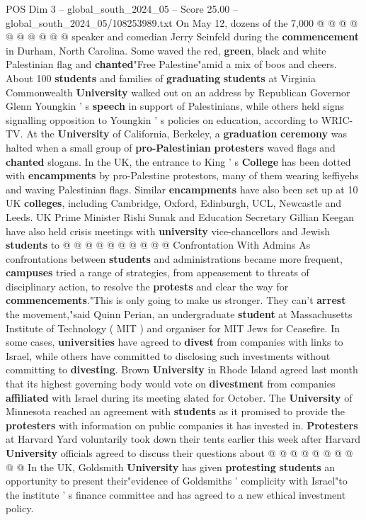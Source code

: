 \begin{textsample}{POS Dim 3 – global\_south\_2024\_05 – Score 25.00 – global\_south\_2024\_05/108253989.txt}
On May 12, dozens of the 7,000 @ @ @ @ @ @ @ @ @ @ speaker and comedian Jerry Seinfeld during the \textbf{commencement} in Durham, North Carolina.
Some waved the red, \textbf{green}, black and white Palestinian flag and \textbf{chanted}"Free Palestine"amid a mix of boos and cheers.
About 100 \textbf{students} and families of \textbf{graduating} \textbf{students} at Virginia Commonwealth \textbf{University} walked out on an address by Republican Governor Glenn Youngkin ' s \textbf{speech} in support of Palestinians, while others held signs signalling opposition to Youngkin ' s policies on education, according to WRIC-TV.
At the \textbf{University} of California, Berkeley, a \textbf{graduation} \textbf{ceremony} was halted when a small group of \textbf{pro-Palestinian} \textbf{protesters} waved flags and \textbf{chanted} slogans.
In the UK, the entrance to King ' s \textbf{College} has been dotted with \textbf{encampments} by pro-Palestine protestors, many of them wearing keffiyehs and waving Palestinian flags.
Similar \textbf{encampments} have also been set up at 10 UK \textbf{colleges}, including Cambridge, Oxford, Edinburgh, UCL, Newcastle and Leeds.
UK Prime Minister Rishi Sunak and Education Secretary Gillian Keegan have also held crisis meetings with \textbf{university} vice-chancellors and Jewish \textbf{students} to @ @ @ @ @ @ @ @ @ @ Confrontation With Admins As confrontations between \textbf{students} and administrations became more frequent, \textbf{campuses} tried a range of strategies, from appeasement to threats of disciplinary action, to resolve the \textbf{protests} and clear the way for \textbf{commencements}."This is only going to make us stronger.
They can't \textbf{arrest} the movement,"said Quinn Perian, an undergraduate \textbf{student} at Massachusetts Institute of Technology ( MIT ) and organiser for MIT Jews for Ceasefire.
In some cases, \textbf{universities} have agreed to \textbf{divest} from companies with links to Israel, while others have committed to disclosing such investments without committing to \textbf{divesting}.
Brown \textbf{University} in Rhode Island agreed last month that its highest governing body would vote on \textbf{divestment} from companies \textbf{affiliated} with Israel during its meeting slated for October.
The \textbf{University} of Minnesota reached an agreement with \textbf{students} as it promised to provide the \textbf{protesters} with information on public companies it has invested in. \textbf{Protesters} at Harvard Yard voluntarily took down their tents earlier this week after Harvard \textbf{University} officials agreed to discuss their questions about @ @ @ @ @ @ @ @ @ @ In the UK, Goldsmith \textbf{University} has given \textbf{protesting} \textbf{students} an opportunity to present their"evidence of Goldsmiths ' complicity with Israel"to the institute ' s finance committee and has agreed to a new ethical investment policy.

\end{textsample}
